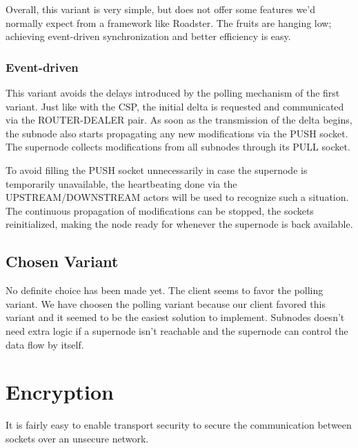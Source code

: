Overall, this variant is very simple, but does not offer some features we'd
normally expect from a framework like Roadster. The fruits are hanging low;
achieving event-driven synchronization and better efficiency is easy.

\subsubsection{Event-driven}
This variant avoids the delays introduced by the polling mechanism of the first
variant. Just like with the \gls{CSP}, the initial delta is requested and
communicated via the ROUTER-DEALER pair. As soon as the transmission of the
delta begins, the subnode also starts propagating any new modifications via the
PUSH socket. The supernode collects modifications from all subnodes through its
PULL socket.

To avoid filling the PUSH socket unnecessarily in case the supernode is
temporarily unavailable, the heartbeating done via the UPSTREAM/DOWNSTREAM actors will
be used to recognize such a situation. The continuous propagation of
modifications can be stopped, the sockets reinitialized, making the node ready
for whenever the supernode is back available.

\subsection{Chosen Variant}
No definite choice has been made yet. The client seems to favor the polling variant.
We have choosen the polling variant because our client favored this variant and
it seemed to be the easiest solution to implement. 
Subnodes doesn't need extra logic if a supernode isn't reachable and the supernode
can control the data flow by itself.

\section{Encryption}\label{sec:approach:encryption}
It is fairly easy to enable transport security to secure the communication
between \zmq sockets over an unsecure network.


